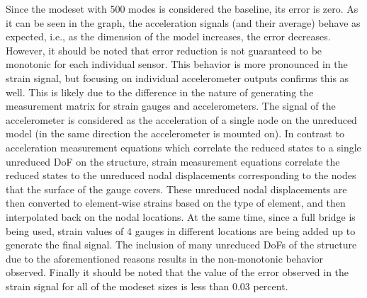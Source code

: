 

Since the modeset with 500 modes is considered the baseline, its error is zero. As it can be seen in the graph, the acceleration signals (and their average) behave as expected, i.e., as the dimension of the model increases, the error decreases. However, it should be noted that error reduction is not guaranteed to be monotonic for each individual sensor. This behavior is more pronounced in the strain signal, but focusing on individual accelerometer outputs confirms this as well. This is likely due to the difference in the nature of generating the measurement matrix for strain gauges and accelerometers. The signal of the accelerometer is considered as the acceleration of a single node on the unreduced model (in the same direction the accelerometer is mounted on). In contrast to acceleration measurement equations which correlate the reduced states to a single unreduced DoF on the structure, strain measurement equations correlate the reduced states to the unreduced nodal displacements corresponding to the nodes that the surface of the gauge covers. These unreduced nodal displacements are then converted to element-wise strains based on the type of element, and then interpolated back on the nodal locations. At the same time, since a full bridge is being used, strain values of 4 gauges in different locations are being added up to generate the final signal. The inclusion of many unreduced DoFs of the structure due to the aforementioned reasons results in the non-monotonic behavior observed. Finally it should be noted that the value of the error observed in the strain signal for all of the modeset sizes is less than 0.03 percent.

